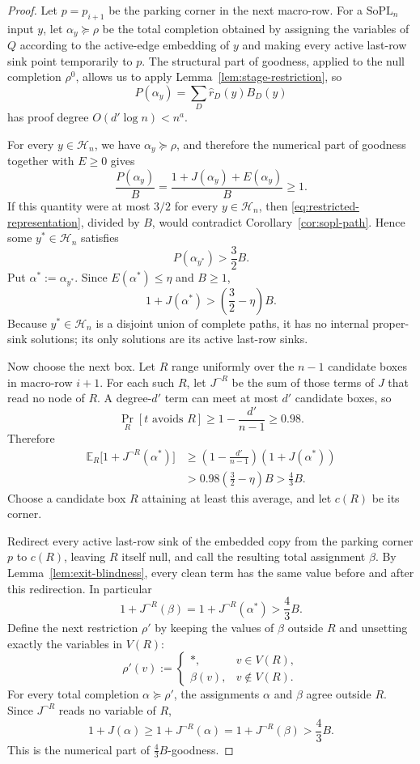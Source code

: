 \documentclass[11pt]{article}
\theoremstyle{definition}
\newcommand{\SoPL}{\mathrm{SoPL}}
\begin{document}
\begin{proof}
Let $p=p_{i+1}$ be the parking corner in the next macro-row.  For a $\SoPL_n$
input $y$, let $\alpha_y\succeq\rho$ be the total completion obtained by assigning
the variables of $Q$ according to the active-edge embedding of $y$ and making every
active last-row sink point temporarily to $p$.  The structural part of goodness,
applied to the null completion $\rho^0$, allows us to apply
Lemma~\ref{lem:stage-restriction}, so
\[
  P(\alpha_y)=\sum_D\widehat r_D(y)B_D(y)
  \tag{6.4}\label{eq:restricted-representation}
\]
has proof degree $O(d'\log n)<n^a$.

For every $y\in\mathcal H_n$, we have $\alpha_y\succeq\rho$, and therefore the
numerical part of goodness together with $E\ge0$ gives
\[
  \frac{P(\alpha_y)}{B}
  =\frac{1+J(\alpha_y)+E(\alpha_y)}{B}\ge1.
\]
If this quantity were at most $3/2$ for every $y\in\mathcal H_n$, then
\eqref{eq:restricted-representation}, divided by $B$, would contradict
Corollary~\ref{cor:sopl-path}.  Hence some $y^*\in\mathcal H_n$ satisfies
\[
  P(\alpha_{y^*})>\frac32B.
\]
Put $\alpha^*:=\alpha_{y^*}$.  Since $E(\alpha^*)\le\eta$ and $B\ge1$,
\[
  1+J(\alpha^*)>
  \left(\frac32-\eta\right)B.
  \tag{6.5}\label{eq:growth-before-fresh-box}
\]
Because $y^*\in\mathcal H_n$ is a disjoint union of complete paths, it has no
internal proper-sink solutions; its only solutions are its active last-row sinks.

Now choose the next box.  Let $R$ range uniformly over the $n-1$ candidate boxes in
macro-row $i+1$.  For each such $R$, let $J^{\neg R}$ be the sum of those terms of
$J$ that read no node of $R$.  A degree-$d'$ term can meet at most $d'$ candidate
boxes, so
\[
  \Pr_R[t\text{ avoids }R]\ge1-\frac{d'}{n-1}\ge0.98.
\]
Therefore
\[
\begin{aligned}
  \mathbb E_R\bigl[1+J^{\neg R}(\alpha^*)\bigr]
  &\ge
  \left(1-\frac{d'}{n-1}\right)(1+J(\alpha^*))\\
  &>0.98\left(\frac32-\eta\right)B
  >\frac43B.
\end{aligned}
\]
Choose a candidate box $R$ attaining at least this average, and let $c(R)$ be its
corner.

Redirect every active last-row sink of the embedded copy from the parking corner $p$
to $c(R)$, leaving $R$ itself null, and call the resulting total assignment $\beta$.
By Lemma~\ref{lem:exit-blindness}, every clean term has the same value before and after
this redirection.  In particular
\[
  1+J^{\neg R}(\beta)=1+J^{\neg R}(\alpha^*)>\frac43B.
\]
Define the next restriction $\rho'$ by keeping the values of $\beta$ outside $R$ and
unsetting exactly the variables in $V(R)$:
\[
  \rho'(v):=
  \begin{cases}
    *, & v\in V(R),\\
    \beta(v), & v\notin V(R).
  \end{cases}
\]
For every total completion $\alpha\succeq\rho'$, the assignments $\alpha$ and $\beta$
agree outside $R$.  Since $J^{\neg R}$ reads no variable of $R$,
\[
  1+J(\alpha)
  \ge1+J^{\neg R}(\alpha)
  =1+J^{\neg R}(\beta)
  >\frac43B.
\]
This is the numerical part of $\frac43B$-goodness.


\end{proof}
\end{document}
